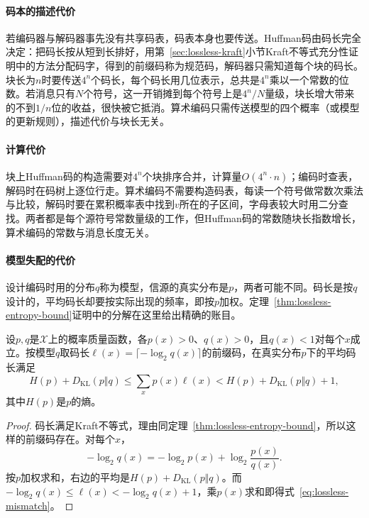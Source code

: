 \paragraph{码本的描述代价}
若编码器与解码器事先没有共享码表，码表本身也要传送。Huffman码由码长完全决定：把码长按从短到长排好，用第~\ref{sec:lossless-kraft}小节Kraft不等式充分性证明中的方法分配码字，得到的前缀码称为规范码，解码器只需知道每个块的码长。块长为$n$时要传送$4^n$个码长，每个码长用几位表示，总共是$4^n$乘以一个常数的位数。若消息只有$N$个符号，这一开销摊到每个符号上是$4^n/N$量级，块长增大带来的不到$1/n$位的收益，很快被它抵消。算术编码只需传送模型的四个概率（或模型的更新规则），描述代价与块长无关。

\paragraph{计算代价}
块上Huffman码的构造需要对$4^n$个块排序合并，计算量$O(4^n\cdot n)$；编码时查表，解码时在码树上逐位行走。算术编码不需要构造码表，每读一个符号做常数次乘法与比较，解码时要在累积概率表中找到$v$所在的子区间，字母表较大时用二分查找。两者都是每个源符号常数量级的工作，但Huffman码的常数随块长指数增长，算术编码的常数与消息长度无关。

\paragraph{模型失配的代价}
设计编码时用的分布$q$称为模型，信源的真实分布是$p$，两者可能不同。码长是按$q$设计的，平均码长却要按实际出现的频率，即按$p$加权。定理~\ref{thm:lossless-entropy-bound}证明中的分解在这里给出精确的账目。

\begin{theorem}[失配的Shannon码]
\label{thm:lossless-mismatch}
设$p,q$是$\mathcal{X}$上的概率质量函数，各$p(x)>0$、$q(x)>0$，且$q(x)<1$对每个$x$成立。按模型$q$取码长$\ell(x)=\lceil-\log_2q(x)\rceil$的前缀码，在真实分布$p$下的平均码长满足
\begin{equation}
 H(p)+D_{\mathrm{KL}}(p\Vert q)\leq\sum_xp(x)\ell(x)<H(p)+D_{\mathrm{KL}}(p\Vert q)+1 ,
 \label{eq:lossless-mismatch}
\end{equation}
其中$H(p)$是$p$的熵。
\end{theorem}

\begin{proof}
码长满足Kraft不等式，理由同定理~\ref{thm:lossless-entropy-bound}，所以这样的前缀码存在。对每个$x$，
\[
 -\log_2q(x)=-\log_2p(x)+\log_2\frac{p(x)}{q(x)} .
\]
按$p$加权求和，右边的平均是$H(p)+D_{\mathrm{KL}}(p\Vert q)$。而$-\log_2q(x)\leq\ell(x)<-\log_2q(x)+1$，乘$p(x)$求和即得式~\eqref{eq:lossless-mismatch}。
\end{proof}

